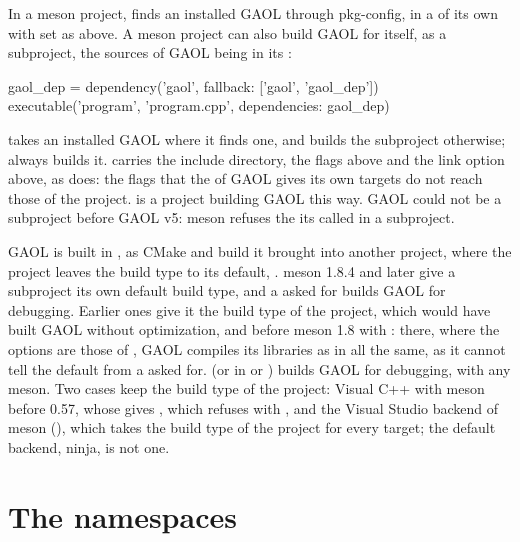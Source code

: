 In a meson project,  finds an installed GAOL through
pkg-config, in a  of its own with  set as
above. A meson project can also build GAOL for itself, as a subproject, the sources of
GAOL being in its :\newinvfive

\begin{example}
gaol_dep = dependency('gaol', fallback: ['gaol', 'gaol_dep'])
executable('program', 'program.cpp', dependencies: gaol_dep)
\end{example}

\noindent
{} takes an installed GAOL where it finds one, and builds the
subproject otherwise; 
always builds it.  carries the include directory, the flags
above and the link option above, as  does: the flags that the
 of GAOL gives its own targets do not reach those of the
project.  is a project building GAOL this way.
GAOL could not be a subproject before GAOL v5: meson refuses the
 its  called in a subproject.

\medskip
GAOL is built in , as CMake and  build it brought
into another project, where the project leaves the build type to its default,
. meson 1.8.4 and later give a subproject its own default build
type, and a  asked for builds GAOL for debugging.
Earlier ones give it the build type of the project, which would have built
GAOL without optimization, and before meson 1.8 with :
there, where the options are those of , GAOL compiles its
libraries as in  all the same, as it cannot tell the default
from a  asked for. 
(or  in  or
) builds GAOL for debugging, with any meson. Two cases keep
the build type of the project: Visual C++ with meson before 0.57, whose
 gives , which  refuses with ,
and the Visual Studio backend of meson (), which takes the
build type of the project for every target; the default backend, ninja, is not
one.\newinvfive

\section{The namespaces}\label{sec:namespaces}
%
%
%

